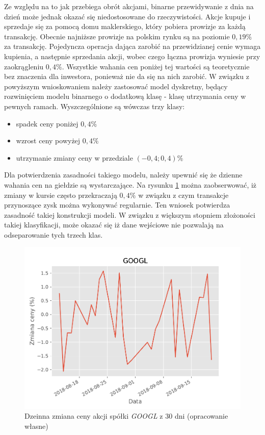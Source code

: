 \documentclass[a4paper, twoside, 11pt, openright]{article}
\begin{document}
Ze względu na to jak przebiega obrót akcjami, binarne przewidywanie z dnia na dzień może jednak okazać się niedostosowane do rzeczywistości. Akcje kupuje i sprzedaje się za pomocą domu maklerskiego, który pobiera prowizje za każdą transakcję. Obecnie najniższe prowizje na polskim rynku są na poziomie $0,19\%$ za transakcję. Pojedyncza operacja dająca zarobić na przewidzianej cenie wymaga kupienia, a następnie sprzedania akcji, wobec czego łączna prowizja wyniesie przy zaokrągleniu $0,4\%$. Wszystkie wahania cen poniżej tej wartości są teoretycznie bez znaczenia dla inwestora, ponieważ nie da się na nich zarobić. W związku z powyższym wnioskowaniem należy zastosować model dyskretny, będący rozwinięciem modelu binarnego o dodatkową klasę - klasę utrzymania ceny w pewnych ramach. Wyszczególnione są wówczas trzy klasy:
\begin{itemize}
\item spadek ceny poniżej $0,4\%$
\item wzrost ceny powyżej $0,4\%$
\item utrzymanie zmiany ceny w przedziale $(-0,4; 0,4)\%$
\end{itemize}

Dla potwierdzenia zasadności takiego modelu, należy upewnić się że dzienne wahania cen na giełdzie są wystarczające. Na rysunku \ref{img:googl_pct_change_last_30} można zaobserwować, iż zmiany w kursie często przekraczają $0,4\%$ w związku z czym transakcje przynoszące zysk można wykonywać regularnie. Ten wniosek potwierdza zasadność takiej konstrukcji modeli. W związku z większym stopniem złożoności takiej klasyfikacji, może okazać się iż dane wejściowe nie pozwalają na odseparowanie tych trzech klas. 

\begin{figure}[H]
\centering \includegraphics[scale=0.9]{img/googl_pct_change_last_30}
\caption{Dzeinna zmiana ceny akcji spółki \textit{GOOGL} z 30 dni (opracowanie własne)}
\label{img:googl_pct_change_last_30}
\end{figure}
\end{document}
